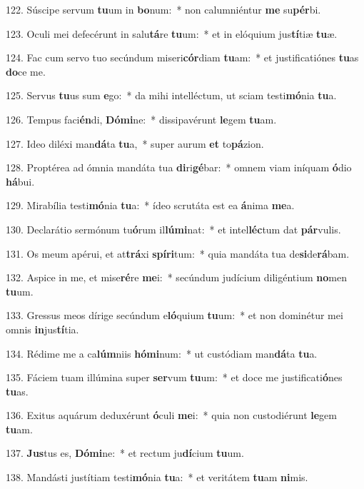 122. Súscipe servum \textbf{tu}um in \textbf{bo}num:~*  non calumniéntur \textbf{me} su\textbf{pér}bi.\

123. Oculi mei defecérunt in salu\textbf{tá}re \textbf{tu}um:~*  et in elóquium jus\textbf{tí}tiæ \textbf{tu}æ.\

124. Fac cum servo tuo secúndum miseri\textbf{cór}diam \textbf{tu}am:~*  et justificatiónes \textbf{tu}as \textbf{do}ce me.\

125. Servus \textbf{tu}us sum \textbf{e}go:~*  da mihi intelléctum, ut sciam testi\textbf{mó}nia \textbf{tu}a.\

126. Tempus faci\textbf{én}di, \textbf{Dó}\textbf{mi}ne:~*  dissipavérunt \textbf{le}gem \textbf{tu}am.\

127. Ideo diléxi man\textbf{dá}ta \textbf{tu}a,~*  super aurum \textbf{et} to\textbf{pá}zion.\

128. Proptérea ad ómnia mandáta tua \textbf{di}ri\textbf{gé}bar:~*  omnem viam iníquam \textbf{ó}dio \textbf{há}bui.\

129. Mirabília testi\textbf{mó}nia \textbf{tu}a:~*  ídeo scrutáta est ea \textbf{á}nima \textbf{me}a.\

130. Declarátio sermónum tu\textbf{ó}rum il\textbf{lú}\textbf{mi}nat:~*  et intel\textbf{léc}tum dat \textbf{pár}vulis.\

131. Os meum apérui, et at\textbf{trá}xi \textbf{spí}\textbf{ri}tum:~*  quia mandáta tua de\textbf{si}de\textbf{rá}bam.\

132. Aspice in me, et mise\textbf{ré}re \textbf{me}i:~*  secúndum judícium diligéntium \textbf{no}men \textbf{tu}um.\

133. Gressus meos dírige secúndum e\textbf{ló}quium \textbf{tu}um:~*  et non dominétur mei omnis \textbf{in}jus\textbf{tí}tia.\

134. Rédime me a ca\textbf{lúm}niis \textbf{hó}\textbf{mi}num:~*  ut custódiam man\textbf{dá}ta \textbf{tu}a.\

135. Fáciem tuam illúmina super \textbf{ser}vum \textbf{tu}um:~*  et doce me justificati\textbf{ó}nes \textbf{tu}as.\

136. Exitus aquárum deduxérunt \textbf{ó}culi \textbf{me}i:~*  quia non custodiérunt \textbf{le}gem \textbf{tu}am.\

137. \textbf{Jus}tus es, \textbf{Dó}\textbf{mi}ne:~*  et rectum ju\textbf{dí}cium \textbf{tu}um.\

138. Mandásti justítiam testi\textbf{mó}nia \textbf{tu}a:~*  et veritátem \textbf{tu}am \textbf{ni}mis.\


